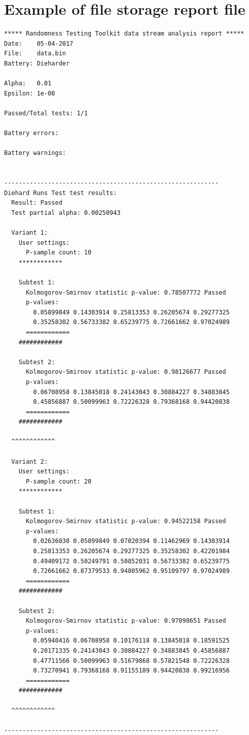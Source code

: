\documentclass[
  digital,  	%
  color,		%
  oneside,   	%
  12pt,
  nocover,
  notable,
  nolof,
  nolot,
]{fithesis3}
\begin{document}
\chapter{Example of file storage report file}
\label{app:file_storage_report}
\begin{verbatim}
***** Randomness Testing Toolkit data stream analysis report *****
Date:    05-04-2017
File:    data.bin
Battery: Dieharder

Alpha:   0.01
Epsilon: 1e-08

Passed/Total tests: 1/1

Battery errors:

Battery warnings:


-----------------------------------------------------------
Diehard Runs Test test results:
  Result: Passed
  Test partial alpha: 0.00250943

  Variant 1:
    User settings: 
      P-sample count: 10
    ************

    Subtest 1:
      Kolmogorov-Smirnov statistic p-value: 0.78507772 Passed
      p-values: 
        0.05899849 0.14303914 0.25813353 0.26205674 0.29277325 
        0.35258302 0.56733382 0.65239775 0.72661662 0.97024989 
      ============
    ############

    Subtest 2:
      Kolmogorov-Smirnov statistic p-value: 0.98126677 Passed
      p-values: 
        0.06708958 0.13845018 0.24143043 0.30884227 0.34883845 
        0.45856887 0.50099963 0.72226328 0.79368168 0.94420838 
      ============
    ############

  ^^^^^^^^^^^^

  Variant 2:
    User settings: 
      P-sample count: 20
    ************

    Subtest 1:
      Kolmogorov-Smirnov statistic p-value: 0.94522158 Passed
      p-values: 
        0.02636030 0.05899849 0.07020394 0.11462969 0.14303914 
        0.25813353 0.26205674 0.29277325 0.35258302 0.42201984 
        0.49409172 0.50249791 0.50852031 0.56733382 0.65239775 
        0.72661662 0.87379533 0.94805962 0.95109797 0.97024989 
      ============
    ############

    Subtest 2:
      Kolmogorov-Smirnov statistic p-value: 0.97098651 Passed
      p-values: 
        0.05940416 0.06708958 0.10176118 0.13845018 0.18591525 
        0.20171335 0.24143043 0.30884227 0.34883845 0.45856887 
        0.47711566 0.50099963 0.51679868 0.57821548 0.72226328 
        0.73270941 0.79368168 0.91155189 0.94420838 0.99216956 
      ============
    ############

  ^^^^^^^^^^^^

-----------------------------------------------------------
\end{verbatim}
\end{document}

